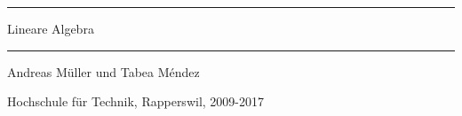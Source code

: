 \documentclass[a4paper,12pt]{book}
\begin{document}
\pagestyle{fancy}
\frontmatter
\newcommand\HRule{\noindent\rule{\linewidth}{1.5pt}}
\begin{titlepage}
\HRule
\vspace*{10pt}
\begin{flushright}
{\Huge
Lineare Algebra}
\end{flushright}
\HRule
\begin{flushright}
\vspace{30pt}
\LARGE
Andreas Müller
und
Tabea Méndez
\end{flushright}
\begin{center}
Hochschule für Technik, Rapperswil, 2009-2017
\end{center}
\end{titlepage}
\hypersetup{
    linktoc=all,
    linkcolor=blue
}
\tableofcontents
\newtheorem{satz}{Satz}[chapter]
\newtheorem{hilfssatz}[satz]{Hilfssatz}
\newtheorem{definition}[satz]{Definition}
\newtheorem{annahme}[satz]{Annahme}
\newtheorem{aufgabe}[satz]{Aufgabe}
\newenvironment{beispiel}[1][Beispiel]{%
\begin{proof}[\bf #1]%
\renewcommand{\qedsymbol}{$\bigcirc$}%
}{\end{proof}}
\mainmatter









%
%
%
%
%
%
%
%
%
%
%
%
%



\vfill
\pagebreak
\ifodd\value{page}\else\null\clearpage\fi

\appendix
\end{document}
